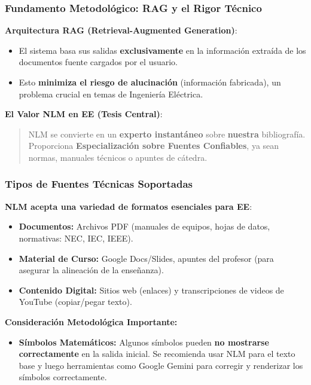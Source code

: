 \documentclass[aspectratio=43]{beamer}
\begin{document}
\begin{frame}
\frametitle{Fundamento Metodológico: RAG y el Rigor Técnico}

\textbf{Arquitectura RAG (Retrieval-Augmented Generation)}:
\begin{itemize}
    \item El sistema basa sus salidas \textbf{exclusivamente} en la información extraída de los documentos fuente cargados por el usuario.
    \item Esto \textbf{minimiza el riesgo de alucinación} (información fabricada), un problema crucial en temas de Ingeniería Eléctrica.
\end{itemize}
\vfill
\textbf{El Valor NLM en EE (Tesis Central)}:
\begin{quote}
NLM se convierte en un \textbf{experto instantáneo} sobre \textbf{nuestra} bibliografía. Proporciona \textbf{Especialización sobre Fuentes Confiables}, ya sean normas, manuales técnicos o apuntes de cátedra.
\end{quote}
\end{frame}

\begin{frame}
\frametitle{Tipos de Fuentes Técnicas Soportadas}

\textbf{NLM acepta una variedad de formatos esenciales para EE}:
\begin{itemize}
    \item \textbf{Documentos:} Archivos PDF (manuales de equipos, hojas de datos, normativas: NEC, IEC, IEEE).
    \item \textbf{Material de Curso:} Google Docs/Slides, apuntes del profesor (para asegurar la alineación de la enseñanza).
    \item \textbf{Contenido Digital:} Sitios web (enlaces) y transcripciones de videos de YouTube (copiar/pegar texto).
\end{itemize}
\vfill
\textbf{Consideración Metodológica Importante:}
\begin{itemize}  
    \item \textbf{Símbolos Matemáticos:} {\small Algunos símbolos pueden \textbf{no mostrarse correctamente} en la salida inicial. Se recomienda usar NLM para el texto base y luego herramientas como Google Gemini para corregir y renderizar los símbolos correctamente.}
\end{itemize}
\end{frame}
\end{document}
